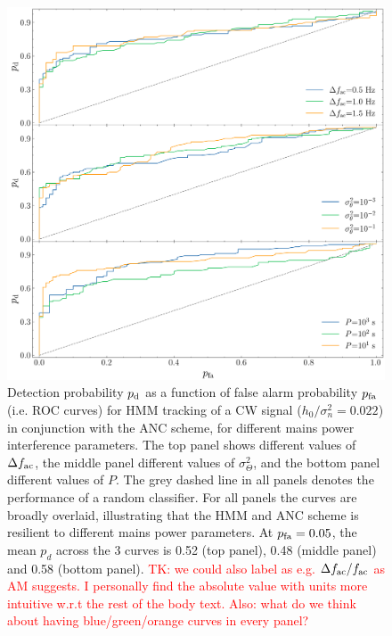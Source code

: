 \documentclass[pra,superscriptaddress,reprint,amsmath,amssymb,nofootinbib]{revtex4-2}
\begin{document}
\begin{figure}
	\begin{center}
		\includegraphics[width=\columnwidth]{images/roc_curve_mains_power_params}
	\end{center}
	\caption{Detection probability $p_{\rm d}$ as a function of false alarm probability $p_{\rm fa}$ (i.e. ROC curves) for HMM tracking of a CW signal ($h_0 / \sigma_n^2 = 0.022$) in conjunction with the ANC scheme, for different mains power interference parameters. The top panel shows different values of $\Delta f_{\rm ac}$, the middle panel different values of $\sigma_{\Theta}^2$, and the bottom panel different values of $P$. The grey dashed line in all panels denotes the performance of a random classifier. For all panels the curves are broadly overlaid, illustrating that the HMM and ANC scheme is resilient to different mains power parameters. At $p_{\rm fa} = 0.05$, the mean $p_{d}$ across the 3 curves is 0.52 (top panel), 0.48 (middle panel) and 0.58 (bottom panel). \textcolor{red}{TK: we could also label as e.g. $\Delta f_{\rm ac} / f_{\rm ac}$ as AM suggests. I personally find the absolute value with units more intuitive w.r.t the rest of the body text. Also: what do we think about having blue/green/orange curves in every panel?}}
	\label{fig:roc1}
\end{figure}
\end{document}
